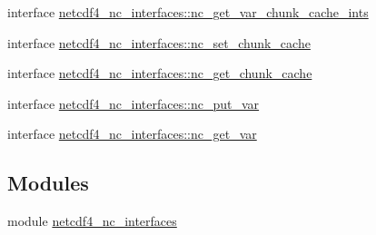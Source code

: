 \begin{DoxyCompactItemize}
\item 
interface \hyperlink{interfacenetcdf4__nc__interfaces_1_1nc__get__var__chunk__cache__ints}{netcdf4\+\_\+nc\+\_\+interfaces\+::nc\+\_\+get\+\_\+var\+\_\+chunk\+\_\+cache\+\_\+ints}
\item 
interface \hyperlink{interfacenetcdf4__nc__interfaces_1_1nc__set__chunk__cache}{netcdf4\+\_\+nc\+\_\+interfaces\+::nc\+\_\+set\+\_\+chunk\+\_\+cache}
\item 
interface \hyperlink{interfacenetcdf4__nc__interfaces_1_1nc__get__chunk__cache}{netcdf4\+\_\+nc\+\_\+interfaces\+::nc\+\_\+get\+\_\+chunk\+\_\+cache}
\item 
interface \hyperlink{interfacenetcdf4__nc__interfaces_1_1nc__put__var}{netcdf4\+\_\+nc\+\_\+interfaces\+::nc\+\_\+put\+\_\+var}
\item 
interface \hyperlink{interfacenetcdf4__nc__interfaces_1_1nc__get__var}{netcdf4\+\_\+nc\+\_\+interfaces\+::nc\+\_\+get\+\_\+var}
\end{DoxyCompactItemize}
\subsection*{Modules}
\begin{DoxyCompactItemize}
\item 
module \hyperlink{namespacenetcdf4__nc__interfaces}{netcdf4\+\_\+nc\+\_\+interfaces}
\end{DoxyCompactItemize}
